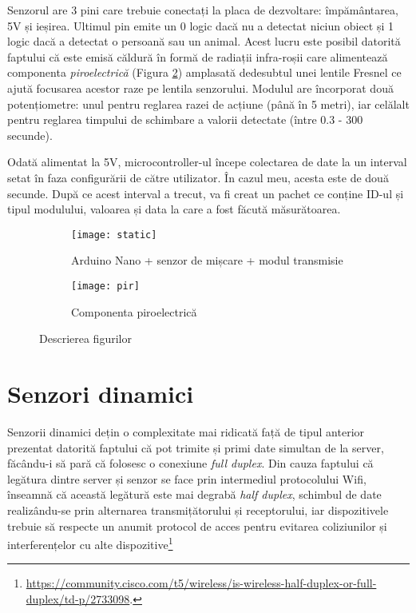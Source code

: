 Senzorul are 3 pini care trebuie conectați la placa de dezvoltare: împământarea, 5V și ieșirea. Ultimul pin emite un 0 logic dacă nu a detectat niciun obiect și 1 logic dacă a detectat o persoană sau un animal. Acest lucru este posibil datorită faptului că este emisă căldură în formă de radiații infra-roșii care alimentează componenta \emph{piroelectrică} (Figura \ref{fig:pir}) amplasată dedesubtul unei lentile Fresnel ce ajută focusarea acestor raze pe lentila senzorului. Modulul are încorporat două potențiometre: unul pentru reglarea razei de acțiune (până în 5 metri), iar celălalt pentru reglarea timpului de schimbare a valorii detectate (între 0.3 - 300 secunde). 

Odată alimentat la 5V, microcontroller-ul începe colectarea de date la un interval setat în faza configurării de către utilizator. În cazul meu, acesta este de două secunde. După ce acest interval a trecut, va fi creat un pachet ce conține ID-ul și tipul modulului, valoarea și data la care a fost făcută măsurătoarea. 

\begin{figure}[h]
	\centering
	\begin{subfigure}{0.45\textwidth}
		\centering
		\texttt{[image: static]}
		\caption{Arduino Nano + senzor de mișcare + modul transmisie}
		\label{fig:static}
	\end{subfigure}
	\hfill
	\begin{subfigure}{0.45\textwidth}
		\centering
		\texttt{[image: pir]}
		\caption{Componenta piroelectrică}
		\label{fig:pir}
	\end{subfigure}
	\caption{Descrierea figurilor}
	\label{fig:all2}
\end{figure}
\break

\section{Senzori dinamici}

Senzorii dinamici dețin o complexitate mai ridicată față de tipul anterior prezentat datorită faptului că pot trimite și primi date simultan de la server, făcându-i să pară că folosesc o conexiune \emph{full duplex}. Din cauza faptului că legătura dintre server și senzor se face prin intermediul protocolului Wifi, înseamnă că această legătură este mai degrabă \emph{half duplex}, schimbul de date realizându-se prin alternarea transmițătorului și receptorului, iar dispozitivele trebuie să respecte un anumit protocol de acces pentru evitarea coliziunilor și interferențelor cu alte dispozitive\footnote{\url{https://community.cisco.com/t5/wireless/is-wireless-half-duplex-or-full-duplex/td-p/2733098}.}

